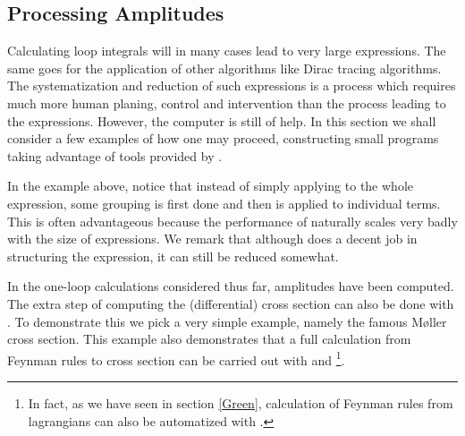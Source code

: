 \subsection{Processing Amplitudes}
\label{process}

Calculating loop integrals will in many cases lead to very large expressions. The same goes for the application of other algorithms like Dirac tracing algorithms. The systematization and reduction of such expressions is a process which requires much more human planing, control and intervention than the process leading to the expressions. However, the computer is still of help. In this section we shall consider a few examples of how one may proceed, constructing small \mma programs taking advantage of tools provided by \fc.

\beom
{}
\enom

In the example above, notice that instead of simply applying  to the whole expression, some grouping is first done and then  is applied to individual terms. This is often advantageous because the performance of  naturally scales very badly with the size of expressions. We remark that although  does a decent job in structuring the expression, it can still be reduced somewhat.

In the one-loop calculations considered thus far, amplitudes have been computed. The extra step of computing the (differential) cross section can also be done with \fc. To demonstrate this we pick a very simple example, namely the famous M{\o}ller cross section. This example also demonstrates that a full calculation from Feynman rules to cross section can be carried out with \fa and \fc \footnote{In fact, as we have seen in section \ref{Green}, calculation of Feynman rules from  lagrangians can also be automatized with \fc.}.

